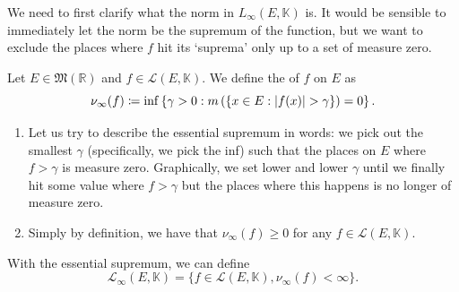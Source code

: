 \documentclass[notoc,notitlepage]{tufte-book}
\begin{document}
We need to first clarify what the norm in $L_\infty(E, \mathbb{K})$ is. It would
be sensible to immediately let the norm be the supremum of the function, but we
want to exclude the places where $f$ hit its `suprema' only up to a set of
measure zero.

\begin{defn}\label{defn:essential_supremum}
  Let $E \in \mathfrak{M}(\mathbb{R})$ and $f \in \mathcal{L}(E, \mathbb{K})$.
  We define the  of $f$ on $E$ as
  \begin{equation*}
    \nu_\infty(f) \coloneqq \inf \left\{ \gamma > 0 : m \left( \{ x \in E :
    \left|f(x)\right| > \gamma \} \right) = 0 \right\}.
  \end{equation*}
\end{defn}

\begin{note}
  \begin{enumerate}
    \item Let us try to describe the essential supremum in words: we pick out
      the smallest $\gamma$ (specifically, we pick the inf) such that the places
      on $E$ where $f > \gamma$ is measure zero. Graphically, we set lower and
      lower $\gamma$ until we finally hit some value where $f > \gamma$ but the
      places where this happens is no longer of measure zero.
    \item Simply by definition, we have that $\nu_\infty(f) \geq 0$ for any $f
      \in \mathcal{L}(E, \mathbb{K})$.
  \end{enumerate}
\end{note}

\begin{defn}\label{defn:_call_infty_e_k_}
  With the essential supremum, we can define
  \begin{equation*}
    \mathcal{L}_\infty(E, \mathbb{K}) = \{ f \in \mathcal{L}(E, \mathbb{K}),
    \nu_\infty(f) < \infty \}.
  \end{equation*}
\end{defn}
\end{document}
